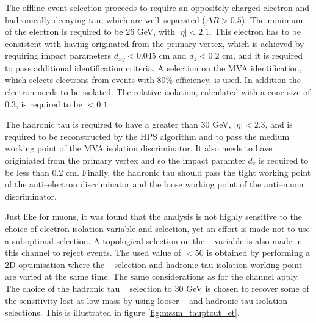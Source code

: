 The offline event selection proceeds to require an oppositely charged
electron and hadronically decaying tau, which are well--separated ($\Delta R > 0.5$).
The minimum \pT of the electron is required to be 26 GeV, with $|\eta| < 2.1$. %
This electron has to be consistent with having originated from the primary vertex, which
is achieved by requiring impact parameters $d_{xy} < 0.045$ cm and $d_{z} < 0.2$ cm, and it
is required to pass additional identification criteria. A selection on the MVA identification, which
selects electrons from \Zee events with 80\% efficiency, is used. In addition the
electron needs to be isolated. The relative isolation, calculated with a cone size of 0.3, is required to be $< 0.1$.

The hadronic tau is required to have a \pT greater than 30 GeV, $|\eta|<2.3$,
and is required to be reconstructed by the HPS algorithm and to pass the medium
working point of the MVA isolation discriminator. It also needs
to have originiated from the primary vertex and so the impact paramter $d_{z}$ is 
required to be less than 0.2 cm. Finally, the hadronic tau should
pass the tight working point of the anti--electron discriminator
and the loose working point of the anti--muon discriminator.

Just like for muons, it was found that the analysis is not highly sensitive
to the choice of electron isolation variable and selection, yet an effort
is made not to use a suboptimal selection.
A topological selection on the \mT~ variable is also made in this channel to reject \Wjets events. 
The used value of \mT $< 50$ is obtained by performing a 2D optimisation where the \mT~ selection
and hadronic tau isolation working point are varied at the same time. The same considerations as
for the \mutau channel apply. The choice of the hadronic tau \pT~ selection to 30 GeV is
chosen to recover some of the sensitivity lost at low mass by using looser \mT~ and hadronic
tau isolation selections. This is illustrated in figure \ref{fig:mssm_tauptcut_et}.

